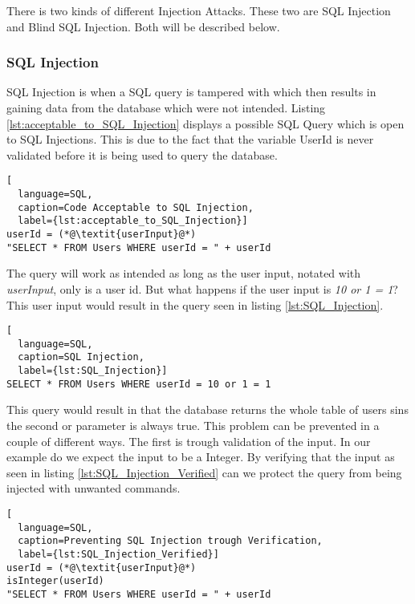 There is two kinds of different Injection Attacks. These two are SQL Injection and Blind SQL Injection. \parencite{Secure_Web} Both will be described below.


\subsubsection{SQL Injection}
SQL Injection is when a SQL query is tampered with which then results in gaining data from the database which were not intended. Listing \ref{lst:acceptable_to_SQL_Injection} displays a possible SQL Query which is open to SQL Injections. This is due to the fact that the variable UserId is never validated before it is being used to query the database. \parencite{JustinClarke-Salt2009SIAa, Secure_Web} 

\hfill
\begin{lstlisting}[
  language=SQL,
  caption=Code Acceptable to SQL Injection,
  label={lst:acceptable_to_SQL_Injection}]
userId = (*@\textit{userInput}@*)
"SELECT * FROM Users WHERE userId = " + userId
\end{lstlisting}
\hfill

The query will work as intended as long as the user input, notated with \textit{userInput}, only is a user id. But what happens if the user input is \textit{10 or 1 = 1}? This user input would result in the query seen in listing \ref{lst:SQL_Injection}.

\hfill
\begin{lstlisting}[
  language=SQL,
  caption=SQL Injection,
  label={lst:SQL_Injection}]
SELECT * FROM Users WHERE userId = 10 or 1 = 1
\end{lstlisting}
\hfill

This query would result in that the database returns the whole table of users sins the second or parameter is always true. This problem can be prevented in a couple of different ways. The first is trough validation of the input. In our example do we expect the input to be a Integer. By verifying that the input as seen in listing \ref{lst:SQL_Injection_Verified} can we protect the query from being injected with unwanted commands.

\hfill
\begin{lstlisting}[
  language=SQL,
  caption=Preventing SQL Injection trough Verification,
  label={lst:SQL_Injection_Verified}]
userId = (*@\textit{userInput}@*)
isInteger(userId)
"SELECT * FROM Users WHERE userId = " + userId
\end{lstlisting}
\hfill

